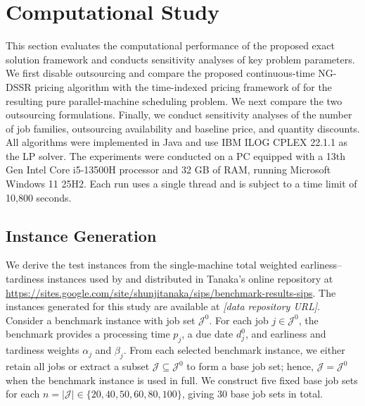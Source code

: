 \section{Computational Study}\label{sec:experiments}

This section evaluates the computational performance of the proposed exact solution
framework and conducts sensitivity analyses of key problem parameters. We first
disable outsourcing and compare the proposed continuous-time
NG-DSSR pricing algorithm with the time-indexed pricing framework of
\citet{bulhoes2020exact} for the resulting pure parallel-machine scheduling problem.
We next compare the two outsourcing formulations. Finally, we conduct sensitivity
analyses of the number of job families, outsourcing availability and baseline price,
and quantity discounts. All algorithms were implemented in Java and use IBM ILOG
CPLEX 22.1.1 as the LP solver. The experiments were conducted on a PC equipped with
a 13th Gen Intel Core i5-13500H processor and 32 GB of RAM, running Microsoft Windows
11 25H2. Each run uses a single thread and is subject to a time limit of 10,800 seconds.

\subsection{Instance Generation}\label{sec:instance-generation}

We derive the test instances from the single-machine total weighted
earliness--tardiness instances used by \citet{tanaka2009exact} and distributed in
Tanaka's online repository at
\url{https://sites.google.com/site/shunjitanaka/sips/benchmark-results-sips}.
The instances generated for this study are available at
\textit{[data repository URL]}. Consider a benchmark instance with job set
$\mathcal J^0$. For each job $j\in\mathcal J^0$, the benchmark provides a
processing time $p_j$, a due date $d_j^0$, and earliness and tardiness weights
$\alpha_j$ and $\beta_j$. From each selected benchmark instance, we either retain
all jobs or extract a subset $\mathcal J\subseteq\mathcal J^0$ to form a base job
set; hence, $\mathcal J=\mathcal J^0$ when the benchmark instance is used in full.
We construct five fixed base job sets for each
$n=|\mathcal J|\in\{20,40,50,60,80,100\}$, giving 30 base job sets in total.


